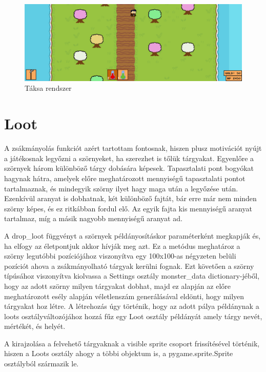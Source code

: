 \begin{figure}[H]
    \centering
    \includegraphics[width=15.5truecm]{images/inventory.png}
    \caption{Táksa rendszer}
    \label{fig:Táska rendszer}
\end{figure}

\section{Loot}

A zsákmányolás funkciót azért tartottam fontosnak, hiszen plusz motivációt nyújt a játékosnak legyőzni a szörnyeket, ha szerezhet is tőlük tárgyakat. Egyenlőre a szörnyek három különböző tárgy dobására képesek. Tapasztalati pont bogyókat hagynak hátra, amelyek előre meghatározott mennyiségű tapasztalati pontot tartalmaznak, és mindegyik szörny ilyet hagy maga után a legyőzése után. Ezenkívül aranyat is dobhatnak, két különböző fajtát, bár erre már nem minden szörny képes, és ez ritkábban fordul elő. Az egyik fajta kis mennyiségű aranyat tartalmaz, míg a másik nagyobb mennyiségű aranyat ad. 

A drop\_loot függvényt a szörnyek példányosításkor paraméterként megkapják és, ha elfogy az életpontjuk akkor hívják meg azt. Ez a metódus meghatároz a szörny legutóbbi pozíciójához viszonyítva egy 100x100-as négyzeten belüli pozíciót ahova a zsákmányolható tárgyak kerülni fognak. Ezt követően a szörny típúsához viszonyítva kiolvassa a Settings osztály monster\_data dictionary-jéből, hogy az adott szörny milyen tárgyakat dobhat, majd ez alapján az előre meghatározott esély alapján véletlenszám generálásával eldönti, hogy milyen tárgyakat hoz létre. A létrehozás úgy történik, hogy az adott pálya példánynak a loots osztályváltozójához hozzá fűz egy Loot osztály példányát amely tárgy nevét, mértékét, és helyét.

A kirajzolása a felvehető tárgyaknak a visible sprite csoport frissítésével történik, hiszen a Loots osztály ahogy a többi objektum is, a pygame.sprite.Sprite osztályból származik le.  


